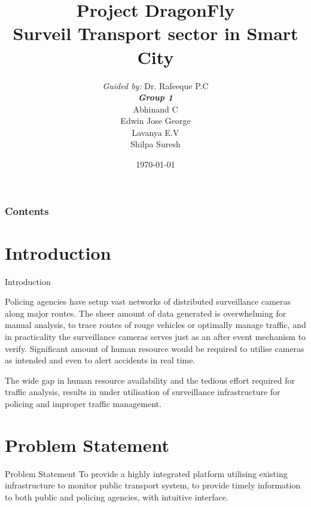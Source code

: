 \documentclass{beamer}
\title[DragonFly]{Project DragonFly \\ Surveil Transport sector in Smart City}
\author[Group 3]{
	{\small \textit{Guided by:}} Dr. Rafeeque P.C \\
	\medskip
	{\small \textbf{\textit{Group 1}}} \\
	Abhinand C \\
	Edwin Jose George \\
	Lavanya E.V \\
	Shilpa Suresh
}
\institute[GCEK]{Government College of Engineering Kannur}
\date{\today}
\begin{document}
\begin{frame}
\titlepage
\end{frame}

\begin{frame}
\frametitle{Contents}
\tableofcontents
\end{frame}


\section{Introduction}
\begin{frame}{Introduction}
	
    Policing agencies have setup vast networks of distributed surveillance cameras along major routes. The sheer amount of data generated is overwhelming for manual analysis, to trace routes of rouge vehicles or optimally manage traffic, and in practicality the surveillance cameras serves just as an after event mechanism to verify. Significant amount of human resource would be required to utilise cameras as intended and even to alert accidents in real time. 
    
    The wide gap in human resource availability and the tedious effort required for traffic analysis, results in under utilisation of surveillance infrastructure for policing and improper traffic management.
    
\end{frame}
\section{Problem Statement}
\begin{frame}{Problem Statement}
	To provide a highly integrated platform utilising existing infrastructure to monitor public transport system, to provide timely information to both public and policing agencies, with intuitive interface.
\end{frame}
\end{document}
